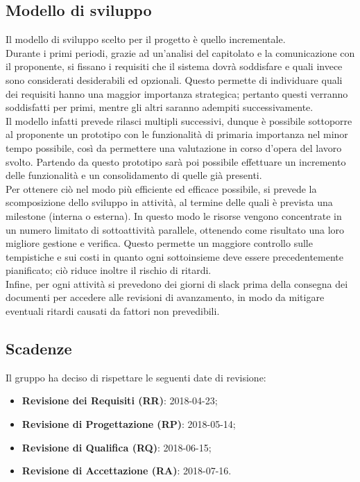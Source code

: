 \subsection{Modello di sviluppo}
Il modello di sviluppo scelto per il progetto è quello incrementale.\\
Durante i primi periodi, grazie ad un'analisi del capitolato e la comunicazione con il proponente, si fissano i requisiti che il sistema dovrà soddisfare e quali invece sono considerati desiderabili ed opzionali. Questo permette di individuare quali dei requisiti hanno una maggior importanza strategica; pertanto questi verranno soddisfatti per primi, mentre gli altri saranno adempiti successivamente.\\
Il modello infatti prevede rilasci multipli successivi, dunque è possibile sottoporre al proponente un prototipo con le funzionalità di primaria importanza nel minor tempo possibile, così da permettere una valutazione in corso d’opera del lavoro svolto. Partendo da questo prototipo sarà poi possibile effettuare un incremento delle funzionalità e un consolidamento di quelle già presenti.\\
Per ottenere ciò nel modo più efficiente ed efficace possibile, si prevede la scomposizione dello sviluppo in attività, al termine delle quali è prevista una milestone (interna o esterna). In questo modo le risorse vengono concentrate in un numero limitato di sottoattività parallele, ottenendo come risultato una loro migliore gestione e verifica.
Questo permette un maggiore controllo sulle tempistiche e sui costi in quanto ogni sottoinsieme deve essere precedentemente pianificato; ciò riduce inoltre il rischio di ritardi.\\
Infine, per ogni attività si prevedono dei giorni di slack prima della consegna dei documenti per accedere alle revisioni di avanzamento, in modo da mitigare eventuali ritardi causati da fattori non prevedibili.

\subsection{Scadenze}\label{Scadenze}
Il gruppo \Gruppo{} ha deciso di rispettare le seguenti date di revisione:
\begin{itemize}
	\item \textbf{Revisione dei Requisiti (RR)}: 2018-04-23;
	\item \textbf{Revisione di Progettazione (RP)}: 2018-05-14;
	\item \textbf{Revisione di Qualifica (RQ)}: 2018-06-15;
	\item \textbf{Revisione di Accettazione (RA)}: 2018-07-16.
\end{itemize}
